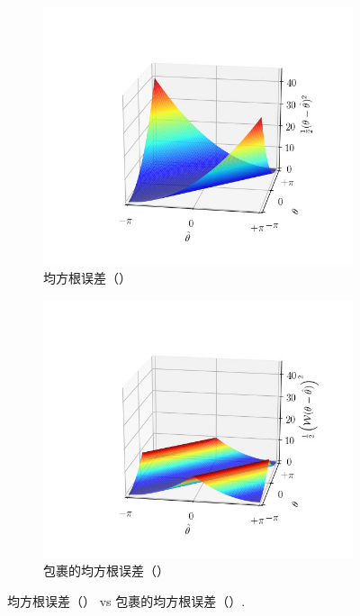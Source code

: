 \renewcommand{\captiontitle}{均方根误差（\MSE{}） vs 包裹的均方根误差（\MSWE{}）}
\begin{figure}
\begin{center}
\begin{subfigure}{0.48\textwidth}
\includegraphics[clip, trim=90 30 50 70,width=1.0\textwidth]{./data/phase-loss.png}
\caption{均方根误差（\MSE{}）}
\end{subfigure}
\begin{subfigure}{0.48\textwidth}
\includegraphics[clip, trim=90 30 50 70,width=1.0\textwidth]{./data/wrapped-phase-loss.png}
\caption{包裹的均方根误差（\MSWE{}）}
\end{subfigure}
\caption[\captiontitle]{\captiontitle{}.}
\label{fig:wrapped-phase-loss}
\end{center}
\end{figure}

